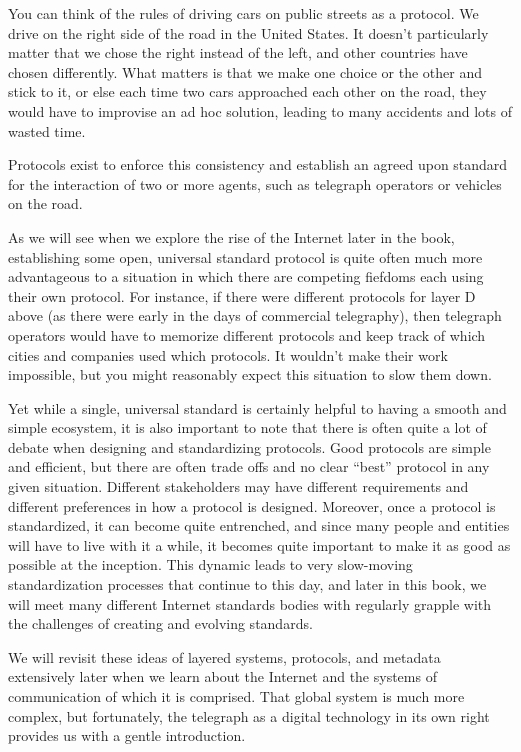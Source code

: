 \documentclass[UTF8]{book}
\begin{document}
\begin{CJK}{UTF8}{gbsn}
You can think of the rules of driving cars on public streets as a protocol. We drive on the right side of the road in the United States. It doesn't particularly matter that we chose the right instead of the left, and other countries have chosen differently. What matters is that we make one choice or the other and stick to it, or else each time two cars approached each other on the road, they would have to improvise an ad hoc solution, leading to many accidents and lots of wasted time.

Protocols exist to enforce this consistency and establish an agreed upon standard for the interaction of two or more agents, such as telegraph operators or vehicles on the road.

As we will see when we explore the rise of the Internet later in the book, establishing some open, universal standard protocol is quite often much more advantageous to a situation in which there are competing fiefdoms each using their own protocol. For instance, if there were different protocols for layer D above (as there were early in the days of commercial telegraphy), then telegraph operators would have to memorize different protocols and keep track of which cities and companies used which protocols. It wouldn't make their work impossible, but you might reasonably expect this situation to slow them down.

Yet while a single, universal standard is certainly helpful to having a smooth and simple ecosystem, it is also important to note that there is often quite a lot of debate when designing and standardizing protocols. Good protocols are simple and efficient, but there are often trade offs and no clear ``best'' protocol in any given situation. Different stakeholders may have different requirements and different preferences in how a protocol is designed. Moreover, once a protocol is standardized, it can become quite entrenched, and since many people and entities will have to live with it a while, it becomes quite important to make it as good as possible at the inception. This dynamic leads to very slow-moving standardization processes that continue to this day, and later in this book, we will meet many different Internet standards bodies with regularly grapple with the challenges of creating and evolving standards.

We will revisit these ideas of layered systems, protocols, and metadata extensively later when we learn about the Internet and the systems of communication of which it is comprised. That global system is much more complex, but fortunately, the telegraph as a digital technology in its own right provides us with a gentle introduction.


\end{CJK}
\end{document}
